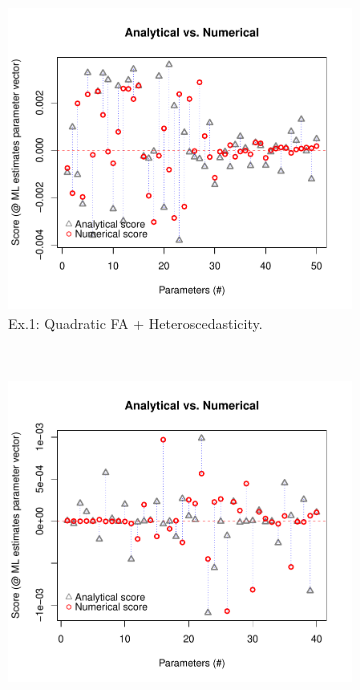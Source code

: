 \documentclass[11pt, a4paper]{article}
\begin{document}
\begin{figure}[h]
\centering
\begin{subfigure}[b]{0.45\textwidth}
\includegraphics[scale = 0.5]{ScoreGausQTHT.pdf}
\caption{Ex.1: Quadratic FA + Heteroscedasticity.}
\label{fig:AppScoreSim1}
\end{subfigure}
~ %
\begin{subfigure}[b]{0.45\textwidth}
\includegraphics[scale = 0.5]{ScoreBinomInt.pdf}

\end{subfigure}
\end{figure}
\end{document}
